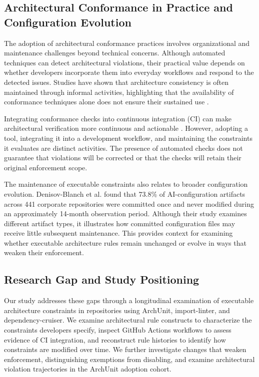 \subsection{Architectural Conformance in Practice and Configuration Evolution}

The adoption of architectural conformance practices involves organizational and maintenance challenges beyond technical concerns. Although automated techniques can detect architectural violations, their practical value depends on whether developers incorporate them into everyday workflows and respond to the detected issues. Studies have shown that architecture consistency is often maintained through informal activities, highlighting that the availability of conformance techniques alone does not ensure their sustained use \cite{ali2018architecture}.

Integrating conformance checks into continuous integration (CI) can make architectural verification more continuous and actionable \cite{pinto2017}. However, adopting a tool, integrating it into a development workflow, and maintaining the constraints it evaluates are distinct activities. The presence of automated checks does not guarantee that violations will be corrected or that the checks will retain their original enforcement scope.

The maintenance of executable constraints also relates to broader configuration evolution. Denisov-Blanch et al. \cite{denisov2026ase} found that 73.8\% of AI-configuration artifacts across 441 corporate repositories were committed once and never modified during an approximately 14-month observation period. Although their study examines different artifact types, it illustrates how committed configuration files may receive little subsequent maintenance. This provides context for examining whether executable architecture rules remain unchanged or evolve in ways that weaken their enforcement.

\subsection{Research Gap and Study Positioning}

Our study addresses these gaps through a longitudinal examination
of executable architecture constraints in repositories using
ArchUnit, import-linter, and dependency-cruiser. We examine
architectural rule constructs to characterize the constraints
developers specify, inspect GitHub Actions workflows to assess
evidence of CI integration, and reconstruct rule histories to
identify how constraints are modified over time. We further
investigate changes that weaken enforcement, distinguishing
exemptions from disabling, and examine architectural violation
trajectories in the ArchUnit adoption cohort.

